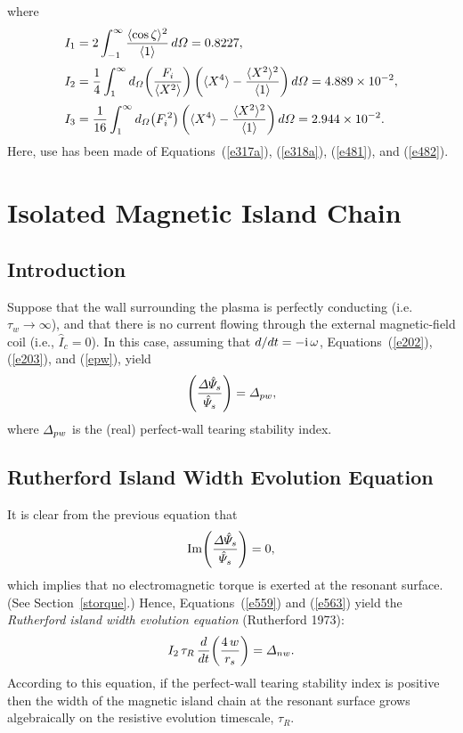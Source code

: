 \documentclass[notitlepage,12pt]{article}
\begin{document}
where
\begin{align}
I_1 &= 2\int_{-1}^\infty \frac{\langle \cos\zeta\rangle^2}{\langle 1\rangle}\,d{\mit\Omega} =0.8227,\\[0.5ex]
I_2&= \frac{1}{4}\int_1^\infty d_{\mit\Omega}\!\left(\frac{F_i}{\langle X^2\rangle}\right)\left(\langle X^4\rangle - \frac{\langle X^2\rangle^2}{\langle 1\rangle}\right)d{\mit\Omega} =4.889\times 10^{-2},\\[0.5ex]
I_3&= \frac{1}{16}\int_1^\infty d_{\mit\Omega}\!\left(F_i^{\,2}\right)\left(\langle X^4\rangle - \frac{\langle X^2\rangle^2}{\langle 1\rangle}\right)d{\mit\Omega} =2.944\times 10^{-2}.
\end{align}
Here, use has been made of Equations~(\ref{e317a}), (\ref{e318a}), (\ref{e481}), and (\ref{e482}). 

\section{Isolated Magnetic Island Chain}
\subsection{Introduction}
Suppose that the wall surrounding the plasma is perfectly conducting (i.e.\, $\tau_w\rightarrow\infty$), and that there is no current
flowing through the external magnetic-field coil (i.e., $\hat{I}_c=0$). In this case, assuming that $d/dt = -{\rm i}\,\omega$, Equations~(\ref{e202}), 
(\ref{e203}), and (\ref{epw}),  yield 
\begin{equation}\label{e563}
\left(\frac{{\mit\Delta}\hat{\mit\Psi}_s}{\hat{\mit\Psi}_s}\right) ={\mit\Delta}_{pw},
\end{equation}
where ${\mit\Delta}_{pw}$ is the (real) perfect-wall tearing stability index. 

\subsection{Rutherford Island Width Evolution Equation}
It is clear from the previous equation that
\begin{equation}
{\rm Im}\!\left(\frac{{\mit\Delta}\hat{\mit\Psi}_s}{\hat{\mit\Psi}_s}\right) = 0,
\end{equation}
which implies that no electromagnetic torque is exerted at the resonant surface. (See Section~\ref{storque}.) 
Hence, Equations~(\ref{e559}) and (\ref{e563}) yield the {\em Rutherford island width evolution equation}\/ (Rutherford 1973):
\begin{equation}
I_2\,\tau_R\,\frac{d}{dt}\!\left(\frac{4\,w}{r_s}\right)= {\mit\Delta}_{nw}.
\end{equation}
According to this equation, if the perfect-wall tearing stability index is positive then the width of the magnetic
island chain at the resonant surface grows algebraically on the resistive evolution timescale, $\tau_R$. 
\end{document}
